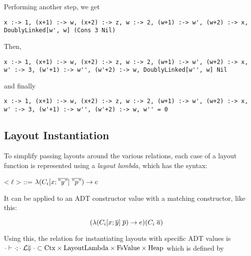\documentclass[10pt]{article}
\begin{document}
Performing another step, we get

\begin{lstlisting}
x :-> 1, (x+1) :-> w, (x+2) :-> z, w :-> 2, (w+1) :-> w', (w+2) :-> x, DoublyLinked[w', w] (Cons 3 Nil)
\end{lstlisting}

Then,

\begin{lstlisting}
x :-> 1, (x+1) :-> w, (x+2) :-> z, w :-> 2, (w+1) :-> w', (w+2) :-> x, w' :-> 3, (w'+1) :-> w'', (w'+2) :-> w, DoublyLinked[w'', w] Nil
\end{lstlisting}

and finally

\begin{lstlisting}
x :-> 1, (x+1) :-> w, (x+2) :-> z, w :-> 2, (w+1) :-> w', (w+2) :-> x, w' :-> 3, (w'+1) :-> w'', (w'+2) :-> w, w'' = 0
\end{lstlisting}

\subsection{Layout Instantiation}

To simplify passing layouts around the various relations, each case of a layout function is represented using a \textit{layout lambda}, which has the
syntax:

\begin{grammar}
  <$\ell$> ::= $\lambda (C_i[x;\overline{"y"}]\; \overline{"p"}) \rightarrow e$
\end{grammar}

\noindent
It can be applied to an ADT constructor value with a matching constructor, like this:

\begin{equation*}
  (\lambda (C_i[x;\overline{y}]\; \overline{p}) \rightarrow e) (C_i\; \overline{a})
\end{equation*}

\noindent
Using this, the relation for instantiating layouts with specific ADT values is
$\cdot \vdash \cdot; \cdot\;\mathcal{L}\!\!\Downarrow\cdot \subset \textnormal{Ctx} \times \textnormal{LayoutLambda} \times \textnormal{FsValue} \times \textnormal{Heap}$ which is defined by
\end{document}
